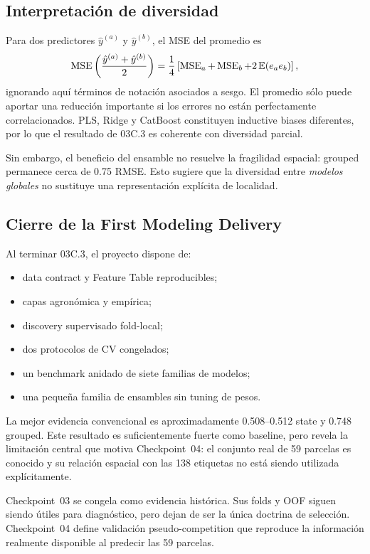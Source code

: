 \subsection{Interpretación de diversidad}

Para dos predictores $\hat y^{(a)}$ y $\hat y^{(b)}$, el MSE del promedio es
\[
\operatorname{MSE}\left(\frac{\hat y^{(a)}+\hat y^{(b)}}{2}\right)
=
\frac{1}{4}
\left[
\operatorname{MSE}_a+\operatorname{MSE}_b
+2\,\mathbb E(e_a e_b)
\right],
\]
ignorando aquí términos de notación asociados a sesgo. El promedio sólo puede aportar una
reducción importante si los errores no están perfectamente correlacionados. PLS, Ridge y
CatBoost constituyen inductive biases diferentes, por lo que el resultado de 03C.3 es
coherente con diversidad parcial.

Sin embargo, el beneficio del ensamble no resuelve la fragilidad espacial: grouped permanece
cerca de 0.75 RMSE. Esto sugiere que la diversidad entre \emph{modelos globales} no sustituye
una representación explícita de localidad.

\subsection{Cierre de la First Modeling Delivery}

Al terminar 03C.3, el proyecto dispone de:
\begin{itemize}
\item data contract y Feature Table reproducibles;
\item capas agronómica y empírica;
\item discovery supervisado fold-local;
\item dos protocolos de CV congelados;
\item un benchmark anidado de siete familias de modelos;
\item una pequeña familia de ensambles sin tuning de pesos.
\end{itemize}

La mejor evidencia convencional es aproximadamente 0.508--0.512 state y 0.748 grouped. Este
resultado es suficientemente fuerte como baseline, pero revela la limitación central que
motiva Checkpoint~04: el conjunto real de 59 parcelas es conocido y su relación espacial con
las 138 etiquetas no está siendo utilizada explícitamente.

\begin{decision}
Checkpoint~03 se congela como evidencia histórica. Sus folds y OOF siguen siendo útiles para
diagnóstico, pero dejan de ser la única doctrina de selección. Checkpoint~04 define validación
pseudo-competition que reproduce la información realmente disponible al predecir las 59
parcelas.
\end{decision}
